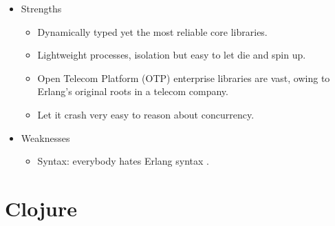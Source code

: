 \documentclass[10pt]{article}
\begin{document}
\begin{itemize}
    \item Strengths
        \begin{itemize}
            \item Dynamically typed yet the most reliable core libraries.
            \item Lightweight processes, isolation but easy to let die and spin
                up.
            \item Open Telecom Platform (OTP) enterprise libraries are vast,
                owing to Erlang's original roots in a telecom company.
            \item Let it crash very easy to reason about concurrency.
        \end{itemize}
    \item Weaknesses
        \begin{itemize}
            \item Syntax: everybody hates Erlang syntax \frownie.
        \end{itemize}
\end{itemize}

\section{Clojure}
\end{document}
